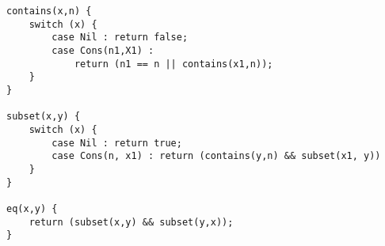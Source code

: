 \begin{lstlisting}
contains(x,n) {
    switch (x) {
        case Nil : return false;
        case Cons(n1,X1) :
            return (n1 == n || contains(x1,n));
    }
}

subset(x,y) {
    switch (x) {
        case Nil : return true;
        case Cons(n, x1) : return (contains(y,n) && subset(x1, y))
    }
}

eq(x,y) {
    return (subset(x,y) && subset(y,x));
}
\end{lstlisting}
